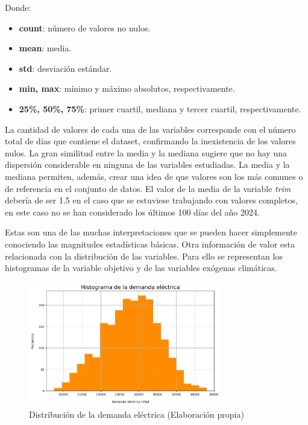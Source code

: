 \documentclass[12pt,a4paper]{report}
\begin{document}
Donde:

\begin{itemize}
    \item \textbf{count}: número de valores no nulos.

    \item \textbf{mean}: media.

    \item \textbf{std}: desviación estándar.

    \item \textbf{min, max}: mínimo y máximo absolutos, respectivamente.

    \item \textbf{25\%, 50\%, 75\%}: primer cuartil, mediana y tercer cuartil, respectivamente.
\end{itemize}

La cantidad de valores de cada una de las variables corresponde con el número total de días que contiene el dataset, confirmando la inexistencia de los valores nulos. La gran similitud entre la media y la mediana sugiere que no hay una dispersión considerable en ninguna de las variables estudiadas. La media y la mediana permiten, además, crear una idea de que valores son los más comunes o de referencia en el conjunto de datos. El valor de la media de la variable \textit{trim} debería de ser 1.5 en el caso que se estuviese trabajando con valores completos, en este caso no se han considerado los últimos 100 días del año 2024.

Estas son una de las muchas interpretaciones que se pueden hacer simplemente conociendo las magnitudes estadísticas básicas. Otra información de valor esta relacionada con la distribución de las variables. Para ello se representan los histogramas de la variable objetivo y de las variables exógenas climáticas.

\begin{figure}[H]
    \centering
    \includegraphics[width=0.75\textwidth]{Images/tfm-3.1A.png}
    \caption{Distribución de la demanda eléctrica (Elaboración propia)}
    \label{fig:hist_demanda}
\end{figure}
\end{document}
